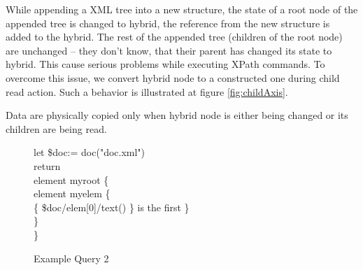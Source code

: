 \documentclass{llncs}
\begin{document}
\begin{description}


        While appending a XML tree into a new structure, the state of a root 
        node of the appended tree is changed to hybrid, the reference from the 
        new structure is added to the hybrid. The rest of the appended tree 
        (children of the root node) are unchanged -- they don't know, that their
        parent has changed its state to hybrid. This cause serious problems
        while executing XPath commands.
        To overcome this issue, we convert hybrid node to a constructed one
        during child read action. Such a behavior is illustrated at figure    
        \ref{fig:childAxis}.
       
    \end{description}

Data are physically copied only when hybrid node is either being changed or
its children are being read. 

\begin{figure}[h]
  \centering
  \begin{code}
    \lineno let \$doc:= doc("doc.xml")\\
    \lineno return\\
    \lineno \> element myroot \{\\
    \lineno \> \> element myelem \{ \\
    \lineno \> \> \> \{ \$doc/elem[0]/text() \} is the first \} \\
    \lineno \> \> \} \\
    \lineno \> \}
  \end{code}
  \caption{Example Query 2}
  \label{ex:textChange}
\end{figure}
\end{document}
